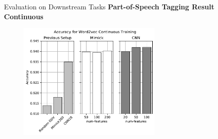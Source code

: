\documentclass{beamer}
\begin{document}
\begin{frame}{Evaluation on Downstream Tasks}
    \textbf{Part-of-Speech Tagging Result Continuous}
    \begin{figure}[H]
        \centering
        \includegraphics[width=70mm]{images/continuous_word2vec}
    \end{figure}
\end{frame}
\end{document}
